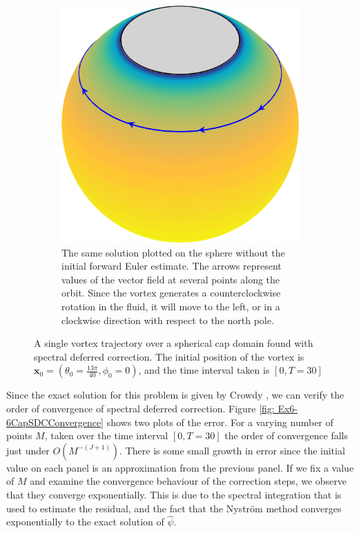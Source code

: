 \documentclass{sfuthesis}
\begin{document}
\begin{figure}[h]
\begin{subfigure}[c]{0.44\textwidth}
		\includegraphics[width=\textwidth]{Ex6-6CapSDC}
		\vspace{0.3cm}
		\caption{The same solution plotted on the sphere without the initial forward Euler estimate. The arrows represent values of the vector field at several points along the orbit. Since the vortex generates a counterclockwise rotation in the fluid, it will move to the left, or in a clockwise direction with respect to the north pole.}
		\label{fig: Ex6-6CapSDC}
	\end{subfigure}
	\caption{A single vortex trajectory over a spherical cap domain found with spectral deferred correction. The initial position of the vortex is $\mathbf{x}_0=(\theta_0=\frac{13\pi}{40}, \phi_0=0)$, and the time interval taken is $[0, T=30]$ }
\end{figure}

Since the exact solution for this problem is given by Crowdy \cite{Crowdy2006}, we can verify the order of convergence of spectral deferred correction. Figure \ref{fig: Ex6-6CapSDCConvergence} shows two plots of the error. For a varying number of points $M$, taken over the time interval $[0,T=30]$ the order of convergence falls just under $O(M^{-(J+1)})$. There is some small growth in error since the initial value on each panel is an approximation from the previous panel. If we fix a value of $M$ and examine the convergence behaviour of the correction steps, we observe that they converge exponentially. This is due to the spectral integration that is used to estimate the residual, and the fact that the Nystr\"{o}m method converges exponentially to the exact solution of $\hat{\psi}$. 
\end{document}
